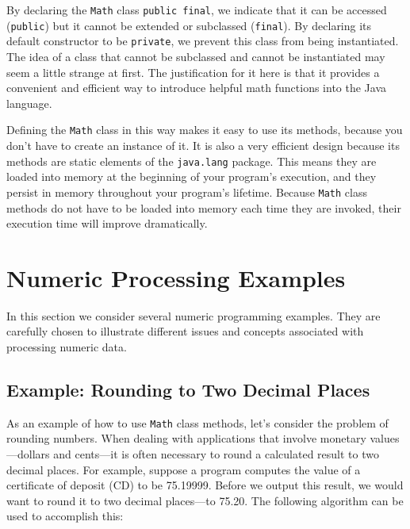 \noindent By declaring the {\tt Math} class {\tt public final},
we indicate that it can be accessed ({\tt public}) but it cannot be
extended or subclassed ({\tt final}). By declaring its default
constructor to be {\tt private}, we prevent this class from being
instantiated.  The idea of a class that cannot be subclassed and
cannot be instantiated may seem a little strange at first. The
justification for it here is that it provides a convenient and
efficient way to introduce helpful math functions into the Java
language.


Defining the {\tt Math} class in this way makes it easy to use its
methods, because you don't have to create an instance of it. It is
also a very efficient design because its methods are static elements
of the {\tt java.lang} package.  This means they are loaded into memory
at the beginning of your program's execution, and they persist in
memory throughout your program's lifetime.  Because {\tt Math} class
methods do not have to be loaded into memory each time they are
invoked, their execution time will improve dramatically.


\section{Numeric Processing Examples}

In this section we consider several numeric programming examples.
They are carefully chosen to illustrate different issues and concepts
associated with processing numeric data. 

\subsection{Example: Rounding to Two Decimal Places}
\noindent As an example of how to use {\tt Math} class methods,
let's consider the problem of rounding numbers. When dealing with
applications that involve monetary values---dollars and cents---it is
often necessary to round a calculated result to two decimal
places. For example, suppose a program computes the value of a
certificate of deposit (CD) to be 75.19999. Before we output this
result, we would want to round it to two decimal places---to 75.20.
The following algorithm can be used to accomplish this:

